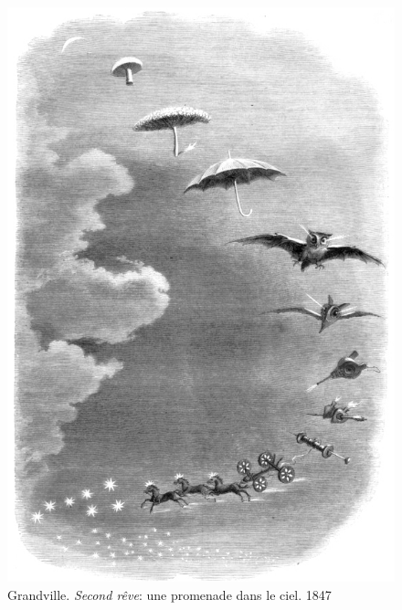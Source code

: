 \begin{figure}[htb]
    \captionsetup{labelformat=empty, skip=25pt, justification=centering}
	\includegraphics[width=\textwidth]{Artworks/Grandville_promenade_BW.jpeg}
	\caption[]{Grandville. \emph{Second rêve}: une promenade dans le ciel. 1847}
\end{figure}

\cleardoublepage
